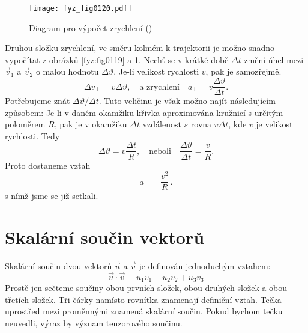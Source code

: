     \begin{figure}[ht!]  %
      \centering
      \texttt{[image: fyz\_fig0120.pdf]}
      \caption{Diagram pro výpočet zrychlení
              (\cite[s.~163]{Feynman01})}
      \label{fyz:fig0120}
    \end{figure}
    Druhou složku zrychlení, ve směru kolmém k trajektorii je možno snadno vypočítat z obrázků
    \ref{fyz:fig0119} a \ref{fyz:fig0120}. Nechť se v krátké době \(\Delta t\) změní úhel mezi 
    \(\vec{v}_1\) a \(\vec{v}_2\) o malou hodnotu \(\Delta\vartheta\). Je-li velikost rychlosti 
    \(v\), pak je samozřejmě.    
    \begin{equation*}
      \Delta v_\perp = v\Delta\vartheta, \quad\text{a zrychlení}\quad
      a_\perp = v\frac{\Delta\vartheta}{\Delta t}.
    \end{equation*}
    Potřebujeme znát \(\Delta\vartheta/\Delta t\). Tuto veličinu je však možno najít následujícím 
    způsobem: Je-li v daném okamžiku křivka aproximována kružnicí s určitým poloměrem \(R\), pak je 
    v okamžiku \(\Delta t\) vzdálenost \(s\) rovna \(v\Delta t\), kde \(v\) je velikost rychlosti. 
    Tedy
    \begin{equation*}
      \Delta\vartheta = v\frac{\Delta t}{R}, \quad\text{neboli}\quad
      \frac{\Delta\vartheta}{\Delta t} = \frac{v}{R}.
    \end{equation*}
    Proto dostaneme vztah
    \begin{equation}\label{fyz:eq159}
      \boxed{a_\perp = \frac{v^2}{R}}\,.
    \end{equation}
    s nímž jsme se již setkali.
    
  \section{Skalární součin vektorů}\label{fyz:IchapXIsecVI}
    Skalární součin dvou vektorů \(\vec{u}\) a \(\vec{v}\) je definován jednoduchým vztahem: 
    \begin{equation*}
      \vec{u}\cdot\vec{v} \equiv u_1v_1 + u_2v_2 + u_3v_3
    \end{equation*}
    Prostě jen sečteme součiny obou prvních složek, obou druhých složek a obou třetích složek. Tři
    čárky namísto rovnítka znamenají definiční vztah. Tečka uprostřed mezi proměnnými znamená
    skalární součin. Pokud bychom tečku neuvedli, výraz by význam tenzorového součinu.

